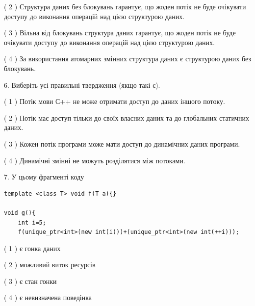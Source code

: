 \documentclass[12pt, ukrainian]{article}
\begin{document}
\begin {large}
{( 2 ) Структура даних без блокувань гарантує, що жоден потік не буде очікувати доступу до виконання операцій над цією структурою даних.%

( 3 ) Вільна від блокувань структура даних гарантує, що жоден потік не буде очікувати доступу до виконання операцій над цією структурою даних.%

( 4 ) За використання атомарних змінних структура даних є структурою даних без блокувань.%
\newpage



\vspace{5mm}
6. Виберіть усі правильні твердження (якщо такі є).\par
\vspace{2mm}

( 1 ) Потік мови С++ не може отримати доступ до даних іншого потоку.%

( 2 ) Потік має доступ тільки до своїх власних даних та до глобальних статичних даних.%

( 3 ) Кожен потік програми може мати доступ до динамічних даних програми.%

( 4 ) Динамічні змінні не можуть розділятися між потоками.%


\vspace{5mm}
7. У цьому фрагменті коду
\begin{verbatim}
template <class T> void f(T a){}

void g(){
    int i=5;
    f(unique_ptr<int>(new int(i)))+(unique_ptr<int>(new int(++i)));
\end{verbatim}
( 1 ) є гонка даних%

( 2 ) можливий виток ресурсів%

( 3 ) є стан гонки%

( 4 ) є невизначена поведінка%
}
\end {large}
\end{document}
